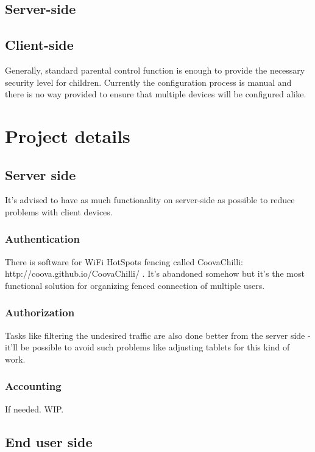 \documentclass[a4paper, sans, booktabs, totpages, english]{report}
\begin{document}
\chapter{Server-side}

\chapter{Client-side}

Generally, standard parental control function is enough to provide the
necessary security level for children. Currently the configuration
process is manual and there is no way provided to ensure that multiple
devices will be configured alike.


\part{Project details}

\chapter{Server side}

It's advised to have as much functionality on server-side as possible
to reduce problems with client devices.


\section{Authentication}

There is software for WiFi HotSpots fencing called CoovaChilli:
http://coova.github.io/CoovaChilli/ . It's abandoned somehow but it's
the most functional solution for organizing fenced connection of
multiple users.


\section{Authorization}

Tasks like filtering the undesired traffic are also done better from
the server side - it'll be possible to avoid such problems like
adjusting tablets for this kind of work.


\section{Accounting}

If needed. WIP.


\chapter{End user side}
\end{document}

